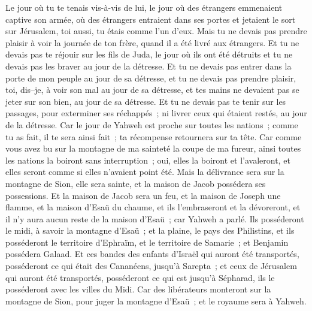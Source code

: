 \begin{multicols}{2}
Le jour où tu te tenais vis-à-vis de lui, le jour où des étrangers emmenaient captive son armée, où des étrangers entraient dans ses portes et jetaient le sort sur Jérusalem, toi aussi, tu étais comme l'un d'eux.
Mais tu ne devais pas prendre plaisir à voir la journée de ton frère, quand il a été livré aux étrangers. Et tu ne devais pas te réjouir sur les fils de Juda, le jour où ils ont été détruits et tu ne devais pas les braver au jour de la détresse.
Et tu ne devais pas entrer dans la porte de mon peuple au jour de sa détresse, et tu ne devais pas prendre plaisir, toi, dis–je, à voir son mal au jour de sa détresse, et tes mains ne devaient pas se jeter sur son bien, au jour de sa détresse.
Et tu ne devais pas te tenir sur les passages, pour exterminer ses réchappés~; ni livrer ceux qui étaient restés, au jour de la détresse.
Car le jour de Yahweh est proche sur toutes les nations~; comme tu as fait, il te sera ainsi fait~; ta récompense retournera sur ta tête.
Car comme vous avez bu sur la montagne de ma sainteté la coupe de ma fureur, ainsi toutes les nations la boiront sans interruption~; oui, elles la boiront et l'avaleront, et elles seront comme si elles n'avaient point été.
Mais la délivrance sera sur la montagne de Sion, elle sera sainte, et la maison de Jacob possédera ses possessions.
Et la maison de Jacob sera un feu, et la maison de Joseph une flamme, et la maison d'Esaü du chaume, et ils l'embraseront et la dévoreront, et il n'y aura aucun reste de la maison d'Esaü~; car Yahweh a parlé.
Ils posséderont le midi, à savoir la montagne d'Esaü~; et la plaine, le pays des Philistins, et ils posséderont le territoire d'Ephraïm, et le territoire de Samarie~; et Benjamin possédera Galaad.
Et ces bandes des enfants d'Israël qui auront été transportés, posséderont ce qui était des Cananéens, jusqu'à Sarepta~; et ceux de Jérusalem qui auront été transportés, posséderont ce qui est jusqu'à Sépharad, ils le posséderont avec les villes du Midi.
Car des libérateurs monteront sur la montagne de Sion, pour juger la montagne d'Esaü~; et le royaume sera à Yahweh.
\PPE{}
\end{multicols}
